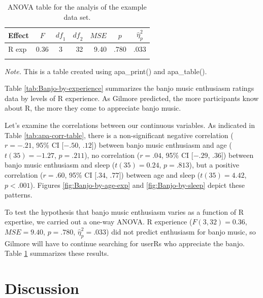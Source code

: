 \documentclass[english,man]{apa6}
\theoremstyle{definition}
\theoremstyle{definition}
\theoremstyle{definition}
\theoremstyle{remark}
\begin{document}
\begin{table}[tbp]
\begin{center}
\begin{threeparttable}
\caption{\label{tab:Banjo-aov-table}ANOVA table for the analyis of the example data set.}
\begin{tabular}{lrcrrrl}
\toprule
Effect & \multicolumn{1}{c}{$F$} & \multicolumn{1}{c}{$\mathit{df}_1$} & \multicolumn{1}{c}{$\mathit{df}_2$} & \multicolumn{1}{c}{$\mathit{MSE}$} & \multicolumn{1}{c}{$p$} & \multicolumn{1}{c}{$\hat{\eta}^2_p$}\\
\midrule
R exp & 0.36 & 3 & 32 & 9.40 & .780 & .033\\
\bottomrule
\addlinespace
\end{tabular}
\begin{tablenotes}[para]
\textit{Note.} This is a table created using apa\_print() and apa\_table().
\end{tablenotes}
\end{threeparttable}
\end{center}
\end{table}

Table \ref{tab:Banjo-by-experience} summarizes the banjo music
enthusiasm ratings data by levels of R experience. As Gilmore predicted,
the more participants know about R, the more they come to appreciate
banjo music.

Let's examine the correlations between our continuous variables. As
indicated in Table \ref{tab:apa-corr-table}, there is a non-significant
negative correlation (\(r = -.21\), 95\% CI \([-.50\), \(.12]\)) between
banjo music enthusiasm and age (\(t(35) = -1.27\), \(p = .211\)), no
correlation (\(r = .04\), 95\% CI \([-.29\), \(.36]\)) between banjo
music enthusiasm and sleep (\(t(35) = 0.24\), \(p = .813\)), but a
positive correlation (\(r = .60\), 95\% CI \([.34\), \(.77]\)) between
age and sleep (\(t(35) = 4.42\), \(p < .001\)). Figures
\ref{fig:Banjo-by-age-exp} and \ref{fig:Banjo-by-sleep} depict these
patterns.

To test the hypothesis that banjo music enthusiasm varies as a function
of R expertise, we carried out a one-way ANOVA. R experience
(\(F(3, 32) = 0.36\), \(\mathit{MSE} = 9.40\), \(p = .780\),
\(\hat{\eta}^2_p = .033\)) did not predict enthusiasm for banjo music,
so Gilmore will have to continue searching for userRs who appreciate the
banjo. Table \ref{tab:Banjo-aov-table} summarizes these results.

\section{Discussion}\label{discussion}
\end{document}
